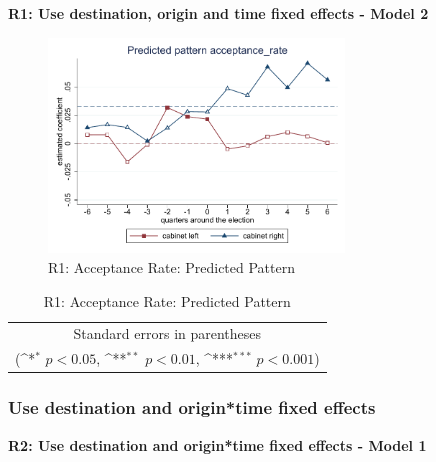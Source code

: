 \documentclass[10pt,a4paper]{scrartcl}
\begin{document}
\clearpage
\textbf{ R1: Use destination, origin and time fixed effects - Model 2}
\begin{figure}[!ht]
	\centering
	\includegraphics[width=0.7\textwidth]{figures_edited/acceptance_rate_graph2_R1.pdf}
	\caption{R1: Acceptance Rate: Predicted Pattern}
\end{figure}

\begin{table}[!ht]\centering
	\footnotesize
	\renewcommand{\arraystretch}{1.2}
	\def\sym#1{\ifmmode^{#1}\else\(^{#1}\)\fi}
	\caption{R1: Acceptance Rate: Predicted Pattern}
	\begin{tabular}{l*{2}{c}}
		\hline\hline
		
		\hline\hline
		\multicolumn{3}{c}{\footnotesize Standard errors in parentheses} \\
		\multicolumn{3}{c}{\footnotesize (\sym{*} \(p<0.05\), \sym{**} \(p<0.01\), \sym{***} \(p<0.001\))}\\
	\end{tabular}
\end{table}


\FloatBarrier
\clearpage
\subsubsection{Use destination and origin*time fixed effects}
\textbf{R2: Use destination and origin*time fixed effects - Model 1}
\end{document}
